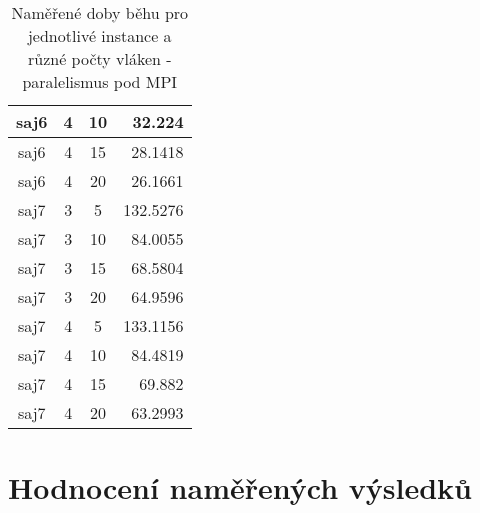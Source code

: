 \documentclass{article} \oddsidemargin=-5mm
\begin{document}
\begin{table}[h]
\begin{tabular}{|c|c|c|r|}
saj6                    & 4                        & 10                    & 32.224                                                    \\ \hline
saj6                    & 4                        & 15                    & 28.1418                                                   \\ \hline
saj6                    & 4                        & 20                    & 26.1661                                                   \\ \hline
saj7                    & 3                        & 5                     & 132.5276                                                  \\ \hline
saj7                    & 3                        & 10                    & 84.0055                                                   \\ \hline
saj7                    & 3                        & 15                    & 68.5804                                                   \\ \hline
saj7                    & 3                        & 20                    & 64.9596                                                   \\ \hline
saj7                    & 4                        & 5                     & 133.1156                                                  \\ \hline
saj7                    & 4                        & 10                    & 84.4819                                                   \\ \hline
saj7                    & 4                        & 15                    & 69.882                                                    \\ \hline
saj7                    & 4                        & 20                    & 63.2993                                                   \\ \hline
\end{tabular}
\caption{Naměřené doby běhu pro jednotlivé instance a různé počty vláken - paralelismus pod MPI}
\label{table-mpi}
\end{table}

\clearpage

\section{Hodnocení naměřených výsledků}
\end{document}
